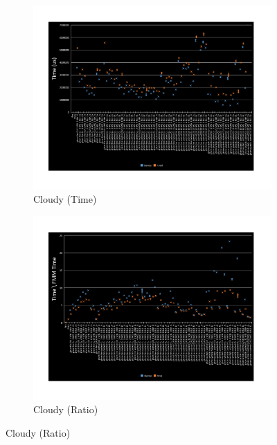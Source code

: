 \documentclass[11pt]{article}       %
\begin{document}
\begin{figure}
	\begin{subfigure}[b]{.4\columnwidth}
		\includegraphics[width=\textwidth]{Figures/time-cloudy}
		\caption{Cloudy (Time)}
	\end{subfigure}
	\begin{subfigure}[b]{.4\columnwidth}
		\includegraphics[width=\textwidth]{Figures/ratio-time-cloudy}
		\caption{Cloudy (Ratio)}
	\end{subfigure}
	

\end{figure}
\end{document}
